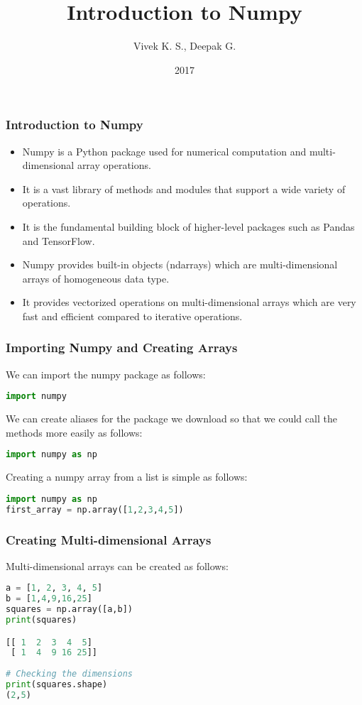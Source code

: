 \documentclass{beamer}
\title{Introduction to Numpy}
\author{Vivek K. S., Deepak G.}
\institute{Information Systems Decision Sciences (ISDS)\\
MUMA College of Business\\
University of South Florida \\
Tampa, Florida}
\date{2017}
\begin{document}
\frame{\titlepage}
\begin{frame}
\frametitle{Introduction to Numpy}
\begin{itemize}
\item Numpy is a Python package used for numerical computation and multi-dimensional array operations.
\item It is a vast library of methods and modules that support a wide variety of operations.
\item It is the  fundamental building block of higher-level packages such as Pandas and TensorFlow.
\item Numpy provides built-in objects (ndarrays) which are multi-dimensional arrays of homogeneous data type.
\item It provides vectorized operations on multi-dimensional arrays which are very fast and efficient compared to iterative  operations.
\end{itemize}
\end{frame}

\begin{frame}[fragile]
\frametitle{Importing Numpy and Creating Arrays}
We can import the numpy package as follows: \\
\begin{lstlisting}[language=Python]
import numpy
\end{lstlisting}
We can create aliases for the package we download so that we could call the methods more easily as follows:
\begin{lstlisting}[language=Python]
import numpy as np
\end{lstlisting}
Creating a numpy array from a list is simple as follows:
\begin{lstlisting}[language=Python]
import numpy as np
first_array = np.array([1,2,3,4,5])
\end{lstlisting}
\end{frame}

\begin{frame}[fragile]
\frametitle{Creating Multi-dimensional Arrays}
Multi-dimensional arrays can be created as follows:
\begin{lstlisting}[language=Python]
a = [1, 2, 3, 4, 5]
b = [1,4,9,16,25]
squares = np.array([a,b])
print(squares)

[[ 1  2  3  4  5]
 [ 1  4  9 16 25]]
 
# Checking the dimensions
print(squares.shape)
(2,5)
\end{lstlisting}
\end{frame}
\end{document}
